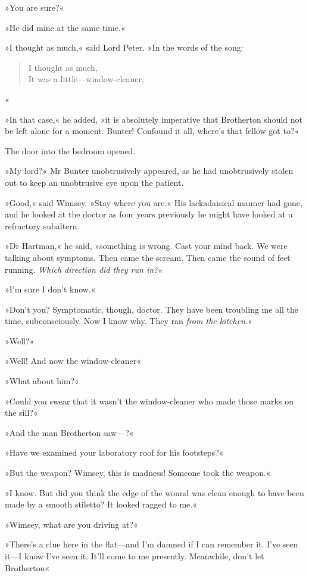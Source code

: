 »You are sure?«

»He did mine at the same time.«

»I thought as much,« said Lord Peter. »In the words of the song:

\begin{verse}
I thought as much,\\
It was a little—window-cleaner,
\end{verse}«

»In that case,« he added, »it is absolutely imperative that Brotherton should not be left alone for a moment. Bunter! Confound it all, where's that fellow got to?«

The door into the bedroom opened.

»My lord?« Mr Bunter unobtrusively appeared, as he had unobtrusively stolen out to keep an unobtrusive eye upon the patient.

»Good,« said Wimsey. »Stay where you are.« His lackadaisical manner had gone, and he looked at the doctor as four years previously he might have looked at a refractory subaltern.

»Dr Hartman,« he said, »something is wrong. Cast your mind back. We were talking about symptoms. Then came the scream. Then came the sound of feet running. \textit{Which direction did they run in?}«

»I'm sure I don't know.«

»Don't you? Symptomatic, though, doctor. They have been troubling me all the time, subconsciously. Now I know why. They ran \textit{from the kitchen}.«

»Well?«

»Well! And now the window-cleaner\longdash«

»What about him?«

»Could you swear that it wasn't the window-cleaner who made those marks on the sill?«

»And the man Brotherton saw—?«

»Have we examined your laboratory roof for his footsteps?«

»But the weapon? Wimsey, this is madness! Someone took the weapon.«

»I know. But did you think the edge of the wound was clean enough to have been made by a smooth stiletto? It looked ragged to me.«

»Wimsey, what are you driving at?«

»There's a clue here in the flat—and I'm damned if I can remember it. I've seen it—I know I've seen it. It'll come to me presently. Meanwhile, don't let Brotherton\longdash«

